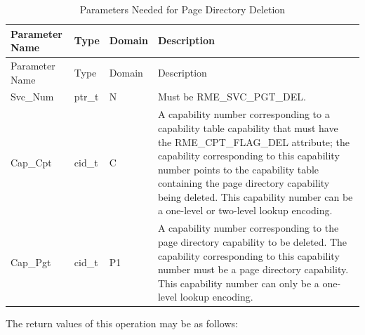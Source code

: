 \begin{xltabular}{\textwidth}{@{}>{\hsize\raggedright\arraybackslash}X>{\hsize\raggedright\arraybackslash}X>{\hsize\raggedright\arraybackslash}X>{\hsize\raggedright\arraybackslash}X@{}}
\caption{Parameters Needed for Page Directory Deletion}\label{tab:3-12-delete-page-directory-parameters}\\
\toprule
Parameter Name & Type & Domain & Description\tabularnewline
\endfirsthead
\toprule
Parameter Name & Type & Domain & Description\tabularnewline
\midrule
\endhead
\bottomrule
\endlastfoot
Svc\_Num & ptr\_t & N & Must be RME\_SVC\_PGT\_DEL.\tabularnewline
Cap\_Cpt & cid\_t & C &
A capability number corresponding to a capability table capability that must have the RME\_CPT\_FLAG\_DEL attribute; the capability corresponding to this capability number points to the capability table containing the page directory capability being deleted. This capability number can be a one-level or two-level lookup encoding.\tabularnewline
Cap\_Pgt & cid\_t & P1 &
A capability number corresponding to the page directory capability to be deleted. The capability corresponding to this capability number must be a page directory capability. This capability number can only be a one-level lookup encoding.\tabularnewline
\end{xltabular}
\nopagebreak[4]

The return values of this operation may be as follows:


